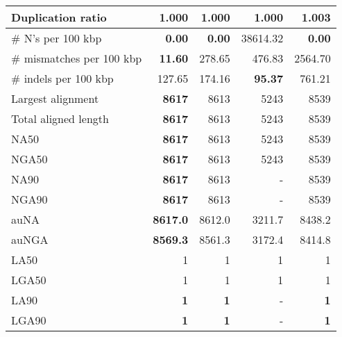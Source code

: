\documentclass[12pt,a4paper]{article}
\begin{document}
\begin{table}[ht]
\begin{center}
\begin{tabular}{|l*{4}{|r}|}
Duplication ratio & {\bf 1.000} & {\bf 1.000} & {\bf 1.000} & 1.003 \\ \hline
\# N's per 100 kbp & {\bf 0.00} & {\bf 0.00} & 38614.32 & {\bf 0.00} \\ \hline
\# mismatches per 100 kbp & {\bf 11.60} & 278.65 & 476.83 & 2564.70 \\ \hline
\# indels per 100 kbp & 127.65 & 174.16 & {\bf 95.37} & 761.21 \\ \hline
Largest alignment & {\bf 8617} & 8613 & 5243 & 8539 \\ \hline
Total aligned length & {\bf 8617} & 8613 & 5243 & 8539 \\ \hline
NA50 & {\bf 8617} & 8613 & 5243 & 8539 \\ \hline
NGA50 & {\bf 8617} & 8613 & 5243 & 8539 \\ \hline
NA90 & {\bf 8617} & 8613 & - & 8539 \\ \hline
NGA90 & {\bf 8617} & 8613 & - & 8539 \\ \hline
auNA & {\bf 8617.0} & 8612.0 & 3211.7 & 8438.2 \\ \hline
auNGA & {\bf 8569.3} & 8561.3 & 3172.4 & 8414.8 \\ \hline
LA50 & 1 & 1 & 1 & 1 \\ \hline
LGA50 & 1 & 1 & 1 & 1 \\ \hline
LA90 & {\bf 1} & {\bf 1} & - & {\bf 1} \\ \hline
LGA90 & {\bf 1} & {\bf 1} & - & {\bf 1} \\ \hline
\end{tabular}
\end{center}
\end{table}
\end{document}
